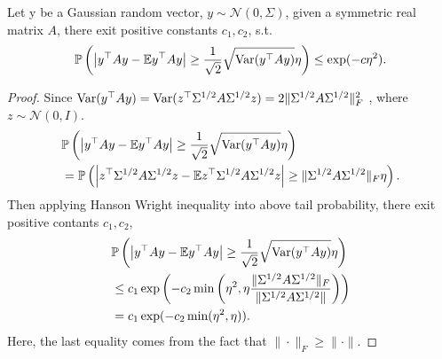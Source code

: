 \begin{lem}
\label{lemma: variant_hanson_wright}
Let y be a Gaussian random vector,  $y\sim \mathcal{N}(0, \Sigma)$, given a symmetric real matrix $A$, there exit positive constants $c_1, c_2$, s.t. 
\begin{equation}
\mathbb{P}\left(\left|y^\top A y - \mathbb{E} y^\top A y\right|\ge \frac{1}{\sqrt{2}}\sqrt{\mbox{Var}(y^\top A y)}\eta \right)\le \exp(-c\eta^2).
\end{equation}
\begin{proof}
Since $\mbox{Var}(y^\top A y) = \mbox{Var}(z^\top\Sigma^{1/2}A\Sigma^{1/2}z) = 2\|\Sigma^{1/2}A\Sigma^{1/2}\|_F^2$ \citep{rencher2008linear}, where $z\sim \mathcal{N}(0, I)$. 
\begin{equation}
\begin{aligned}
&\mathbb{P}\left(\left|y^\top A y - \mathbb{E} y^\top A y\right|\ge \frac{1}{\sqrt{2}}\sqrt{\mbox{Var}(y^\top A y)}\eta \right)\\
&= \mathbb{P}\left(\left|z^\top \Sigma^{1/2}A\Sigma^{1/2} z - \mathbb{E} z^\top \Sigma^{1/2}A\Sigma^{1/2} z\right|\ge \|\Sigma^{1/2}A\Sigma^{1/2}\|_F \eta \right). 
\end{aligned}
\end{equation}
Then applying Hanson Wright inequality \citep{rudelson2013hanson} into above tail probability, there exit positive contants $c_1, c_2$,
\begin{equation}
\begin{aligned}
&\mathbb{P}\left(\left|y^\top A y - \mathbb{E} y^\top A y\right|\ge \frac{1}{\sqrt{2}}\sqrt{\mbox{Var}(y^\top A y)}\eta \right)\\
& \le c_1\exp\left(-c_2 \min \left(\eta^2, \eta \frac{\|\Sigma^{1/2}A\Sigma^{1/2}\|_F}{\|\Sigma^{1/2}A\Sigma^{1/2}\|}\right)\right)\\
& = c_1\exp(-c_2\min(\eta^2, \eta)).
\end{aligned}
\end{equation}
Here, the last equality comes from the fact that $\|\cdot\|_F\ge \|\cdot\|$. 
\end{proof}
\end{lem}

